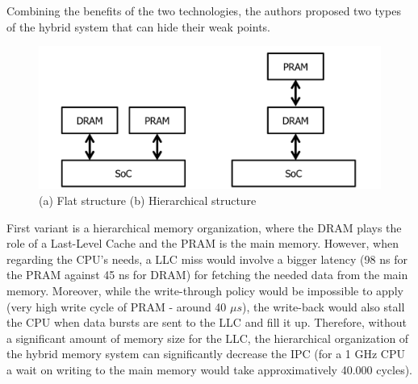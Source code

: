 \documentclass[journal]{IEEEtran}
\begin{document}
Combining the benefits of the two technologies, the authors proposed two types of the hybrid system that can hide their weak points. 
\begin{figure}[h]
\centering
\includegraphics[width = 8 cm]{graphics/structure-hybrid.png}
\caption{(a) Flat structure (b) Hierarchical structure}\label{fig:structure}
\end{figure} 
First variant is a hierarchical memory organization, where the DRAM plays the role of a Last-Level Cache and the PRAM is the main memory. However, when regarding the CPU’s needs, a LLC miss would involve a bigger latency (98 ns for the PRAM against 45 ns for DRAM) for fetching the needed data from the main memory. Moreover, while the write-through policy would be impossible to apply (very high write cycle of PRAM - around 40 $\mu s$), the write-back would also stall the CPU when data bursts are sent to the LLC and fill it up. Therefore, without a significant amount of memory size for the LLC, the hierarchical organization of the hybrid memory system can significantly decrease the IPC (for a 1 GHz CPU a wait on writing to the main memory would take approximatively 40.000 cycles).
\end{document}
